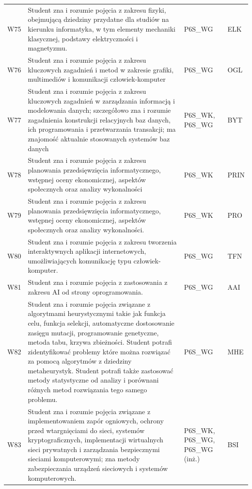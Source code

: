 \documentclass[12pt,a4paper]{article}
\begin{document}
{\begin{longtable}{m{1cm}m{8.8cm}m{2.1cm}m{2.5cm}}
\rowcolor{tableRowLight} W75 & Student zna i rozumie pojęcia z zakresu fizyki, obejmującą dziedziny przydatne dla studiów na kierunku informatyka, w tym elementy mechaniki klasycznej, podstawy elektryczności i magnetyzmu. & {\scriptsize P6S\_WG} & {\scriptsize ELK} \\
\rowcolor{tableRowAlt} W76 & Student zna i rozumie pojęcia z zakresu kluczowych zagadnień i metod w zakresie grafiki, multimediów i komunikacji człowiek-komputer & {\scriptsize P6S\_WG} & {\scriptsize OGL} \\
\rowcolor{tableRowLight} W77 & Student zna i rozumie pojęcia z zakresu kluczowych zagadnień w zarządzania informacją i modelowania danych; szczegółowo zna i rozumie zagadnienia konstrukcji relacyjnych baz danych, ich programowania i przetwarzania transakcji; ma znajomość aktualnie stosowanych systemów baz danych & {\scriptsize P6S\_WK, P6S\_WG} & {\scriptsize BYT} \\
\rowcolor{tableRowAlt} W78 & Student zna i rozumie pojęcia z zakresu planowania przedsięwzięcia informatycznego, wstępnej oceny ekonomicznej, aspektów społecznych oraz analizy wykonalności & {\scriptsize P6S\_WK} & {\scriptsize PRIN} \\
\rowcolor{tableRowLight} W79 & Student zna i rozumie pojęcia z zakresu planowania przedsięwzięcia informatycznego, wstępnej oceny ekonomicznej, aspektów społecznych oraz analizy wykonalności. & {\scriptsize P6S\_WK} & {\scriptsize PRO} \\
\rowcolor{tableRowAlt} W80 & Student zna i rozumie pojęcia z zakresu tworzenia interaktywnych aplikacji internetowych, umożliwiających komunikację typu człowiek-komputer. & {\scriptsize P6S\_WG} & {\scriptsize TFN} \\
\rowcolor{tableRowLight} W81 & Student zna i rozumie pojęcia z zastosowania z zakresu AI od strony oprogramowania. & {\scriptsize P6S\_WG} & {\scriptsize AAI} \\
\rowcolor{tableRowAlt} W82 & Student zna i rozumie pojęcia związane z algorytmami heurystycznymi takie jak funkcja celu, funkcja selekcji, automatyczne dostosowanie zasięgu mutacji, programowanie genetyczne, metoda tabu, krzywa zbieżności. Student potrafi zidentyfikować problemy które można rozwiązać za pomocą algorytmów z dziedziny metaheurystyk. Student potrafi także zastosować metody statystyczne od analizy i porównani różnych metod rozwiązania tego samego problemu. & {\scriptsize P6S\_WG} & {\scriptsize MHE} \\
\rowcolor{tableRowLight} W83 & Student zna i rozumie pojęcia związane z implementowaniem zapór ogniowych, ochrony przed wtargnięciami do sieci, systemów kryptograficznych, implementacji wirtualnych sieci prywatnych i zarządzania bezpiecznymi sieciami komputerowymi; zna metody zabezpieczania urządzeń sieciowych i systemów komputerowych. & {\scriptsize P6S\_WK, P6S\_WG, P6S\_WG {\scriptsize (inż.)}} & {\scriptsize BSI} \\

\end{longtable}}
\end{document}
